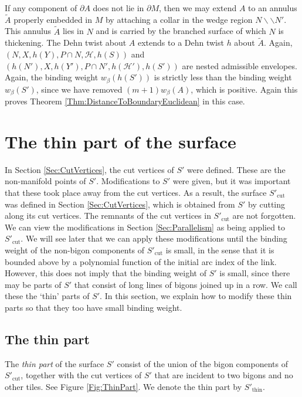 \documentclass[oneside]{amsart}
\numberwithin{equation}{section}
\theoremstyle{plain}
\theoremstyle{definition}
\newcommand{\cut}{\backslash\backslash}
\begin{document}
If any component of $\partial A$ does not lie in $\partial M$,
then we may extend $A$ to an annulus $\tilde A$ properly embedded in $M$ by attaching
a collar in the wedge region $N \cut N'$. This annulus
$\tilde A$ lies in $N$ and is carried by the branched surface of which $N$ is thickening.
The Dehn twist about $A$ extends to a Dehn twist $h$ about $\tilde A$.
Again, $(N, X, h(Y), P \cap N, \mathcal{H}, h(S))$ and $(h(N'), X, h(Y'), P \cap N', h(\mathcal{H}'), h(S'))$ are nested admissible envelopes.
Again, the binding weight $w_\beta(h(S'))$ is strictly less than the binding weight $w_\beta(S')$,
since we have removed $(m+1) w_\beta(A)$, which is positive. Again this proves 
Theorem \ref{Thm:DistanceToBoundaryEuclidean} in this case.

\section{The thin part of the surface}
\label{Sec:Thin}

In Section \ref{Sec:CutVertices}, the cut vertices of $S'$ were defined. These are the non-manifold points of $S'$. Modifications
to $S'$ were given, but it was important that these took place away from the cut vertices. As a result, the 
surface $S'_{\mathrm{cut}}$ was defined in Section \ref{Sec:CutVertices}, 
which is obtained from $S'$ by cutting along its cut vertices. The remnants of
the cut vertices in $S'_{\mathrm{cut}}$ are not forgotten. We can view the modifications in Section \ref{Sec:Parallelism} as being
applied to $S'_{\mathrm{cut}}$. We will see later that we can apply these modifications until the binding weight of
the non-bigon components of $S'_{\mathrm{cut}}$ is small, in the sense that it is bounded above by a polynomial function 
of the initial arc index of the link. However, this does not imply that the binding weight of $S'$ is small,
since there may be parts of $S'$ that consist of long lines of bigons joined up in a row. We call these
the `thin' parts of $S'$. In this section, we explain how to modify these thin parts so that they too have small
binding weight.

\subsection{The thin part}
\label{Subsec:ThinDefn}

The \emph{thin part} of the surface $S'$ consist of the union of the bigon components of $S'_{\mathrm{cut}}$, together
with the cut vertices of $S'$ that are incident to two bigons and no other tiles. See Figure \ref{Fig:ThinPart}.
We denote the thin part by $S'_{\textrm{thin}}$.
\end{document}
